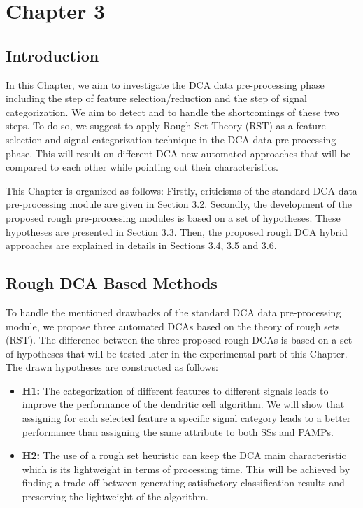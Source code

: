 \chapter{Chapter 3}
\section{Introduction}
In this Chapter, we aim to  investigate   the DCA data pre-processing phase including the step of feature selection/reduction   and the step of signal categorization. We aim to detect and to handle  the shortcomings of these two steps. To do so,  we suggest to apply Rough Set Theory (RST) as a feature selection and signal categorization technique in the DCA data pre-processing phase. This will result on different DCA new automated approaches that will be compared to each other while pointing out their characteristics. 

This Chapter is organized as follows: Firstly,  criticisms of the standard DCA  data pre-processing  module are given in Section 3.2. Secondly,  the development  of the proposed  rough   pre-processing modules is based on a set of hypotheses. These hypotheses are  presented in Section   3.3. Then, the proposed rough DCA hybrid approaches are explained in details in Sections 3.4, 3.5 and 3.6.

\section{Rough DCA Based Methods}
To handle the mentioned  drawbacks of the standard DCA data pre-processing module, we propose three automated  DCAs based on the theory of rough sets (RST). The difference between the three proposed rough DCAs is based on a set of hypotheses that will be tested later in the experimental part of this Chapter. The drawn hypotheses are constructed as follows:
\begin{itemize}
\item  \textbf{H1:} The categorization of different features to different signals leads to improve the performance of the dendritic cell algorithm. We will show that assigning for each selected feature a specific signal category  leads to a better performance than assigning the same attribute to both SSs and PAMPs.
\item  \textbf{H2:} The use of a rough set heuristic  can keep the DCA main characteristic which is its lightweight in terms of processing time. This will be achieved by finding a trade-off between generating satisfactory classification results and preserving the lightweight of the algorithm.
\end{itemize}

